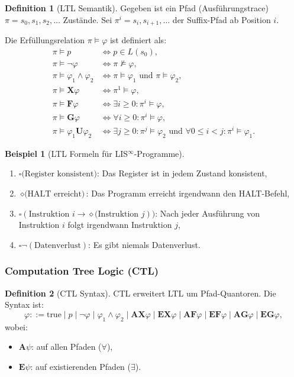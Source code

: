 \documentclass[a4paper,12pt]{article}
\theoremstyle{definition}
\newtheorem{definition}{Definition}
\newtheorem{beispiel}{Beispiel}
\begin{document}
	\begin{definition}[LTL Semantik]
		\label{def:ltl_semantik}
		Gegeben ist ein Pfad (Ausführungstrace) $\pi = s_0, s_1, s_2, \ldots$ Zustände. Sei $\pi^i = s_i, s_{i+1}, \ldots$ der Suffix-Pfad ab Position $i$.
		
		Die Erfüllungsrelation $\pi \models \varphi$ ist definiert als:
		\begin{align}
			\pi \models p &\iff p \in L(s_0), \\
			\pi \models \neg\varphi &\iff \pi \not\models \varphi, \\
			\pi \models \varphi_1 \land \varphi_2 &\iff \pi \models \varphi_1 \text{ und } \pi \models \varphi_2, \\
			\pi \models \mathbf{X}\varphi &\iff \pi^1 \models \varphi, \\
			\pi \models \mathbf{F}\varphi &\iff \exists i \geq 0: \pi^i \models \varphi, \\
			\pi \models \mathbf{G}\varphi &\iff \forall i \geq 0: \pi^i \models \varphi, \\
			\pi \models \varphi_1 \mathbf{U} \varphi_2 &\iff \exists j \geq 0: \pi^j \models \varphi_2 \text{ und } \forall 0 \leq i < j: \pi^i \models \varphi_1.
		\end{align}
	\end{definition}
	
	\begin{beispiel}[LTL Formeln für LIS$^{\infty}$-Programme]
		\label{bsp:ltl_lis_unendlich}
		\begin{enumerate}
			\item $\square \text{(Register konsistent)}$: Das Register ist in jedem Zustand konsistent,
			\item $\diamond \text{(HALT erreicht)}$: Das Programm erreicht irgendwann den HALT-Befehl,
			\item $\square (\text{Instruktion } i \to \diamond \text{(Instruktion } j))$: Nach jeder Ausführung von Instruktion $i$ folgt irgendwann Instruktion $j$,
			\item $\square \neg(\text{Datenverlust})$: Es gibt niemals Datenverlust.
		\end{enumerate}
	\end{beispiel}
	
	\subsubsection{Computation Tree Logic (CTL)}
	
	\begin{definition}[CTL Syntax]
		\label{def:ctl_syntax}
		CTL erweitert LTL um Pfad-Quantoren. Die Syntax ist:
		\[
		\varphi ::= \text{true} \mid p \mid \neg \varphi \mid \varphi_1 \land \varphi_2 \mid \mathbf{AX}\varphi \mid \mathbf{EX}\varphi \mid \mathbf{AF}\varphi \mid \mathbf{EF}\varphi \mid \mathbf{AG}\varphi \mid \mathbf{EG}\varphi,
		\]
		wobei:
		\begin{itemize}
			\item $\mathbf{A}\psi$: auf allen Pfaden ($\forall$),
			\item $\mathbf{E}\psi$: auf existierenden Pfaden ($\exists$).
		\end{itemize}
	\end{definition}
	
\end{document}

